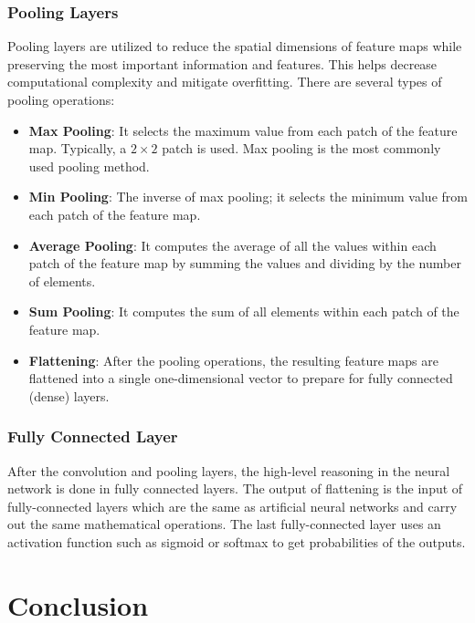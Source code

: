 \subsubsection{Pooling Layers}

Pooling layers are utilized to reduce the spatial dimensions of feature maps while preserving the most important information and features. This helps decrease computational complexity and mitigate overfitting. There are several types of pooling operations:

\begin{itemize}
  \item \textbf{Max Pooling}:
        It selects the maximum value from each patch of the feature map. Typically, a $2 \times 2$ patch is used. Max pooling is the most commonly used pooling method.

  \item \textbf{Min Pooling}:
        The inverse of max pooling; it selects the minimum value from each patch of the feature map.

  \item \textbf{Average Pooling}:
        It computes the average of all the values within each patch of the feature map by summing the values and dividing by the number of elements.

  \item \textbf{Sum Pooling}:
        It computes the sum of all elements within each patch of the feature map.

  \item \textbf{Flattening}:
        After the pooling operations, the resulting feature maps are flattened into a single one-dimensional vector to prepare for fully connected (dense) layers.
\end{itemize}

\subsubsection{Fully Connected Layer}

After the convolution and pooling layers, the high-level reasoning in the neural network is done in fully connected layers. The output of flattening is the input of fully-connected layers which are the same as artificial neural networks and carry out the same mathematical operations. The last fully-connected layer uses an activation function such as sigmoid or softmax to get probabilities of the outputs.



\section{Conclusion}
\label{sec:conclusion}


